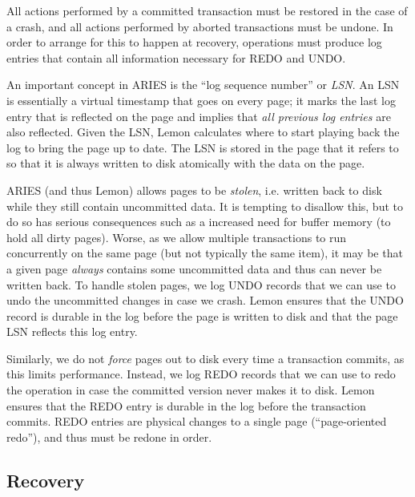 \documentclass[10pt,letterpaper,twocolumn,english]{article}
\newcommand{\yad}{Lemon\xspace}
\begin{document}
All actions performed by a committed transaction must be
restored in the case of a crash, and all actions performed by aborted
transactions must be undone. In order to arrange for this
to happen at recovery, operations must produce log entries that contain
all information necessary for REDO and UNDO.

An important concept in ARIES is the ``log sequence number'' or {\em
LSN}.  An LSN is essentially a virtual timestamp that goes on every
page; it marks the last log entry that is reflected on the page and
implies that {\em all previous log entries} are also reflected.  Given the
LSN, \yad calculates where to start playing back the log to bring the
page up to date.  The LSN is stored in the page that it refers to so
that it is always written to disk atomically with the data on the
page.

ARIES (and thus \yad) allows pages to be {\em stolen}, i.e. written
back to disk while they still contain uncommitted data.  It is
tempting to disallow this, but to do so has serious consequences such as
a increased need for buffer memory (to hold all dirty pages). Worse,
as we allow multiple transactions to run concurrently on the same page
(but not typically the same item), it may be that a given page {\em
always} contains some uncommitted data and thus can never be written
back.  To handle stolen pages, we log UNDO records that
we can use to undo the uncommitted changes in case we crash.  \yad
ensures that the UNDO record is durable in the log before the
page is written to disk and that the page LSN reflects this log entry.

Similarly, we do not {\em force} pages out to disk every time a transaction
commits, as this limits performance.  Instead, we log REDO records
that we can use to redo the operation in case the committed version never
makes it to disk.  \yad ensures that the REDO entry is durable in the
log before the transaction commits.  REDO entries are physical changes
to a single page (``page-oriented redo''), and thus must be redone in
order. 





\subsection{Recovery}
\label{recovery}

%
\end{document}

